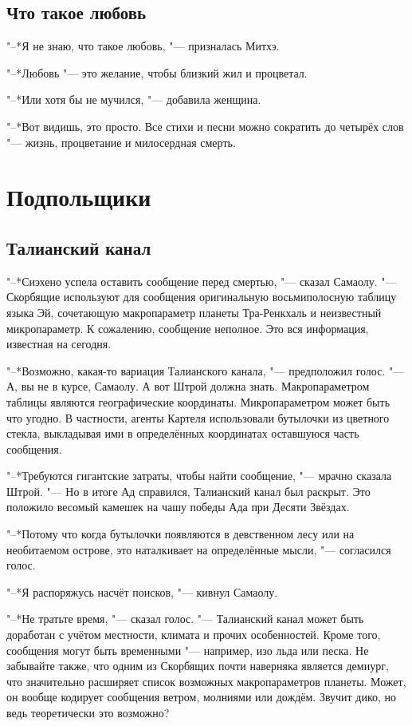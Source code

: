 \documentclass[a4paper,10pt,fleqn]{book}
\begin{document}
\section{Что такое любовь}

"--*Я не знаю, что такое любовь, "--- призналась Митхэ.

"--*Любовь "--- это желание, чтобы близкий жил и процветал.

"--*Или хотя бы не мучился, "--- добавила женщина.

"--*Вот видишь, это просто.
Все стихи и песни можно сократить до четырёх слов "--- жизнь, процветание и милосердная смерть.

\chapter{Подпольщики}

\section{Талианский канал}

"--*Сиэхено успела оставить сообщение перед смертью, "--- сказал Самаолу.
"--- Скорбящие используют для сообщения оригинальную восьмиполосную таблицу языка Эй, сочетающую макропараметр планеты Тра-Ренкхаль и неизвестный микропараметр.
К сожалению, сообщение неполное.
Это вся информация, известная на сегодня.

"--*Возможно, какая-то вариация Талианского канала, "--- предположил голос.
"--- А, вы не в курсе, Самаолу.
А вот Штрой должна знать.
Макропараметром таблицы являются географические координаты.
Микропараметром может быть что угодно.
В частности, агенты Картеля использовали бутылочки из цветного стекла, выкладывая ими в определённых координатах оставшуюся часть сообщения.

"--*Требуются гигантские затраты, чтобы найти сообщение, "--- мрачно сказала Штрой.
"--- Но в итоге Ад справился, Талианский канал был раскрыт.
Это положило весомый камешек на чашу победы Ада при Десяти Звёздах.

"--*Потому что когда бутылочки появляются в девственном лесу или на необитаемом острове, это наталкивает на определённые мысли, "--- согласился голос.

"--*Я распоряжусь насчёт поисков, "--- кивнул Самаолу.

"--*Не тратьте время, "--- сказал голос.
"--- Талианский канал может быть доработан с учётом местности, климата и прочих особенностей.
Кроме того, сообщения могут быть временными "--- например, изо льда или песка.
Не забывайте также, что одним из Скорбящих почти наверняка является демиург, что значительно расширяет список возможных макропараметров планеты.
Может, он вообще кодирует сообщения ветром, молниями или дождём.
Звучит дико, но ведь теоретически это возможно?
\end{document}
